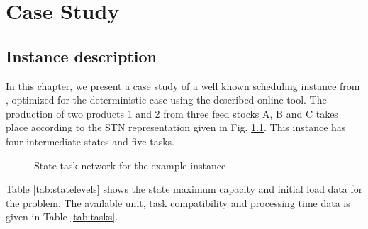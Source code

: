 \chapter{Case Study}
\thispagestyle{plain}

\section{Instance description}
In this chapter, we present a case study of a well known scheduling instance from \cite{KONDILI1993211}, optimized for the deterministic case using the described online tool. The production of two products 1 and 2 from three feed stocks A, B and C takes place according to the STN representation given in Fig. \ref{fig:STN}. This instance has four intermediate states and five tasks.

\begin{figure}[htb]
\centering
{}
\caption{State task network for the example instance}
\label{fig:STN}
\end{figure}

Table \ref{tab:statelevels} shows the state maximum capacity and initial load data for the problem. The available unit, task compatibility and processing time data is given in Table \ref{tab:tasks}.

